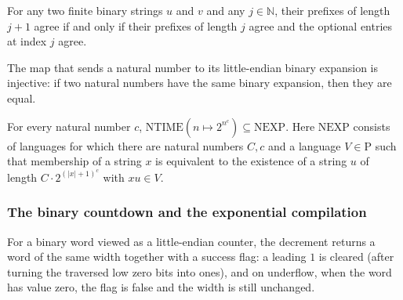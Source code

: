 \begin{lemma}
\label{Complexity.e3c_take_succ_eq}
\leanok
{}
For any two finite binary strings $u$ and $v$ and any $j\in\mathbb{N}$, their prefixes
of length $j+1$ agree if and only if their prefixes of length $j$ agree and the optional
entries at index $j$ agree.
\end{lemma}

\begin{lemma}
\label{Complexity.e3c_bits_injective}
\leanok
{}
The map that sends a natural number to its little-endian binary expansion is injective:
if two natural numbers have the same binary expansion, then they are equal.
\end{lemma}

\begin{theorem}
\label{Complexity.ntime_expPow_subset_NEXP}
\leanok
{}
For every natural number $c$, $\mathrm{NTIME}(n\mapsto 2^{n^c})\subseteq\mathrm{NEXP}$.
Here $\mathrm{NEXP}$ consists of languages for which there are natural numbers $C,c$ and
a language $V\in\mathrm{P}$ such that membership of a string $x$ is equivalent to the
existence of a string $u$ of length $C\cdot 2^{(|x|+1)^c}$ with $xu\in V$.
\end{theorem}

\subsubsection{The binary countdown and the exponential compilation}

\begin{definition}
\label{Complexity.a2Debit}
\leanok
For a binary word viewed as a little-endian counter, the decrement returns a word of the same width together with a success flag: a leading $1$ is cleared (after turning the traversed low zero bits into ones), and on underflow, when the word has value zero, the flag is false and the width is still unchanged.
\end{definition}

